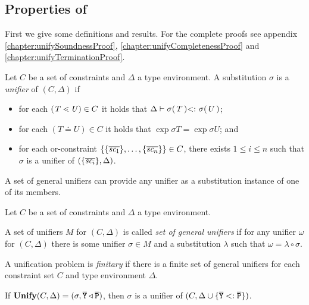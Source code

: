 \subsection{Properties of \unify{}}
\label{sec:properties-unify}

First we give some definitions and results.
For the complete proofs see appendix \ref{chapter:unifySoundnessProof}, \ref{chapter:unifyCompletenessProof} and \ref{chapter:unifyTerminationProof}.

\begin{definition}[Unifier]
  Let $C$ be a set of constraints and $\Delta$ a type environment.
  A substitution $\sigma$  is a \emph{unifier} of $(C,\Delta)$ if
  \begin{itemize}
  \item for each $(\mathit{T} \lessdot \mathit{U}) \in C$ it holds that
    $\Delta \vdash \sigma(\,T\,) \textrm{$<:$}\  \sigma(\,U\,)$;
  \item  for each $(T \doteq U) \in C$ it holds that
    $\exp{\sigma}{T} = \exp{\sigma}{U}$; and
  \item for each or-constraint $\{ \{ \overline{\textit{sc}_1} \},
      \ldots, \{ \overline{\textit{sc}_n} \} \} \in C$, there exists $1
    \le i \le n$ such that $\sigma$ is a unifier of
    $(\{ \overline{\textit{sc}_i} \}, \Delta)$. 
  \end{itemize}
\end{definition}

A set of general unifiers can provide any unifier as a substitution
instance of one of its members.
\begin{definition}
  Let $C$ be a set of constraints and $\Delta$ a type environment. 

  A set of unifiers $M$ for $(C, \Delta)$
  is called \emph{set of general unifiers} if for any unifier $\omega$
  for $(C, \Delta)$ there is some unifier $\sigma \in M$ and a substitution
  $\lambda$ such that $\omega = \lambda   \circ \sigma$.
\end{definition}

A unification problem is \emph{finitary} if there is a finite set of
general unifiers for each constraint set $C$ and type environment $\Delta$.

\begin{theorem}[Soundness]
  \label{theo:unifySoundness}
   If $\textbf{Unify}{}(C, \Delta) = {(\sigma,  \overline{\tt Y} \triangleleft
     \overline{\tt P})}$, then $\sigma$ is a unifier of $(C,\Delta \cup \{ \overline{\tt Y} <: \overline{\tt P} \})$. 
\end{theorem}

